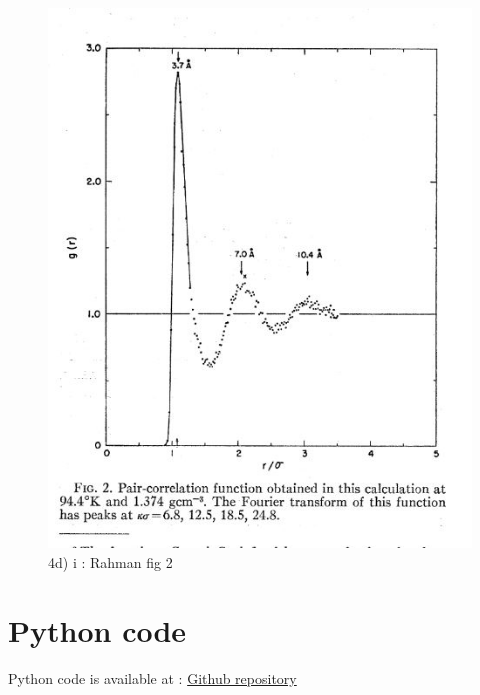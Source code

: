 \documentclass[a4paper,10pt,english]{article}
\begin{document}
\begin{figure}[h!]
        \centering 
        \includegraphics[scale=0.9]{./py/Rahman2.jpg} 
        \caption{4d) i : Rahman fig 2 }
        \label{fig:Rahman2}
\end{figure}

\section{Python code}
Python code is available at : 
\href{https://github.com/herreovertidogrom/prosjektMolekyl}{Github repository} 
\end{document}
